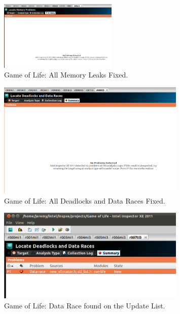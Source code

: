 \documentclass[journal,10pt,onecolumn]{IEEEtran}
\begin{document}
\begin{figure}[!t]
\begin{center}
\includegraphics[width=0.5\textwidth]{figures/ChangeSet14_Memory.png}
\caption{Game of Life: All Memory Leaks Fixed.}
\label{fig:inspector_clean_memory}
\end{center}
\end{figure}

\begin{figure}[!t]
\begin{center}
\includegraphics[width=0.8\textwidth]{figures/ChangeSet14.png}
\caption{Game of Life: All Deadlocks and Data Races Fixed.}
\label{fig:inspector_clean_deadlocks}
\end{center}
\end{figure}

\begin{figure}[!t]
\begin{center}
\includegraphics[width=0.8\textwidth]{figures/Data_Race_Anaylsis.png}
\caption{Game of Life: Data Race found on the Update List.}
\label{fig:inspector_data_race_allocator}
\end{center}
\end{figure}
\end{document}
